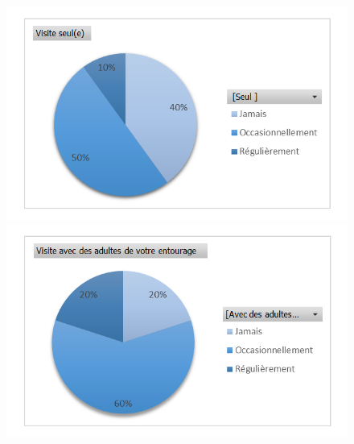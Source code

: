 \begin{figure}
\centering
\begin{minipage}[c]{.49\linewidth}
\includegraphics[width=\textwidth]{figures/visiteseul.png}
\end{minipage} \hfill
\begin{minipage}{.49\textwidth}
\includegraphics[width=\textwidth]{figures/visiteadulte.png}
\end{minipage}


\end{figure}
